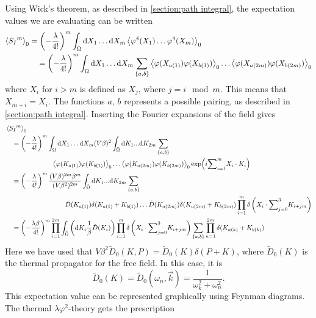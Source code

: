 Using Wick's theorem, as described in \autoref{section:path integral}, the expectation values we are evaluating can be written
\begin{align*}
    \ex{{S_I}^m}_0 & 
    = \left(- \frac{\lambda }{4!}\right)^m 
    \int_{\Omega} \dd X_1 \dots \dd X_m
    \ex{\varphi^4(X_1) \dots \varphi^4(X_m)}_0 \\ 
    & \quad
    = \left(- \frac{\lambda }{4!}\right)^m 
    \int_{\Omega} \dd X_1 \dots \dd X_m \sum_{\{a, b\}}
    \ex{\varphi(X_{a(1)}) \varphi(X_{b(1)})}_0
    \dots
    \ex{\varphi(X_{a(2m)}) \varphi(X_{b(2m)})}_0
\end{align*}
where $X_i$ for $i>m$ is defined as $X_j$, where $j = i \mod m$.
This means that $X_{m + i} = X_i$.
The functions $a,\,b$ represents a possible pairing, as described in \autoref{section:path integral}.
Inserting the Fourier expansions of the field gives
\begin{align*}
    & \ex{{S_I}^m}_0 \\
    &\quad 
    = \left(-\frac{\lambda }{4!}\right)^m 
    \int_{\Omega} \dd X_1 \dots \dd X_m
    (V \beta)^2 \int_{\tilde \Omega} \dd K_1 ... \dd K_{2m} \sum_{\{a, b\}} \\
    & \quad \quad \quad \quad\quad \quad \quad
    \ex{\varphi(K_{a(1)}) \varphi(K_{b(1)})}_0
    \dots
    \ex{\varphi(K_{a(2m)}) \varphi(K_{b(2m)})}_0     
    \exp(i {\sum}_{i=1}^{m} X_i \cdot K_i)\\ 
    & \quad  
    = \left(-\frac{\lambda }{4!}\right)^m 
    \frac{(V \beta)^{2m} \beta^m}{(V \beta^2)^{2m}}
    \int_{\tilde \Omega} \dd K_1 ... \dd K_{2m} \sum_{\{a, b\}} \\
    & \quad \quad \quad \quad \quad \quad \quad \quad \quad
    \tilde D(K_{a(1)}) \delta(K_{a(1)} + K_{b(1)}) \dots 
    \tilde D(K_{a(2m)}) \delta(K_{a(2m)} + K_{b(2m)})
    \prod_{i=1}^m \delta\left(X_i \cdot {\sum}_{j=0}^3 K_{i + jm}\right) \\
    & \quad 
    = \left(-\frac{\lambda \beta}{4!}\right)^m 
    \prod_{i=1}^{2m} \int_{\tilde \Omega} 
    \left( \dd K_i \frac{1}{\beta} \tilde D(K_i)  \right) 
    \prod_{i=1}^m \delta\left(X_i \cdot {\sum}_{j=0}^3 K_{i + jm}\right)
    \sum_{\{a, b\}} 
    \prod_{n=1}^{2m}\delta(K_{a(k)} + K_{b(k)})
\end{align*}
Here we have used that $V \beta^2 \tilde D_0(K, P) = \tilde D_0(K) \delta(P + K)$, where $\tilde D_0(K)$ is the thermal propagator for the free field.
In this case, it is
\begin{equation}
    \tilde D_0(K) = \tilde D_0(\omega_n, \vec k) = \frac{1}{\omega_k^2 + \omega_n^2}.
\end{equation}
This expectation value can be represented graphically using Feynman diagrams.
The thermal $\lambda \varphi^2$-theory gets the prescription

